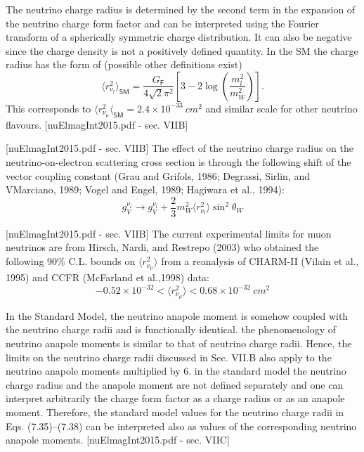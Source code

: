 The neutrino charge radius is determined by the second term in the expansion of the neutrino charge form factor and can be interpreted using the Fourier transform of a spherically symmetric charge distribution. It can also be negative since the charge density is not a positively defined quantity. In the SM the charge radius has the form of (possible other definitions exist)
\begin{equation}
\langle r_{\nu_l}^2\rangle_{\textsf{SM}}=\frac{G_{\textsf{F}}}{4\sqrt{2}\pi^2}\left[3-2\log\left(\frac{m_l^2}{m_W^2}\right)\right].
\end{equation}
This corresponds to $\langle r_{\nu_{\mu}}^2\langle_{\textsf{SM}}=2.4\times 10^{-33}\ \unit{cm^2}$ and similar scale for other neutrino flavours. [nuElmagInt2015.pdf - sec. VIIB]

[nuElmagInt2015.pdf - sec. VIIB]
The effect of the neutrino charge radius on the neutrino-on-electron scattering cross section is through the following shift of the vector coupling constant (Grau and Grifols, 1986; Degrassi, Sirlin, and VMarciano, 1989; Vogel and Engel, 1989; Hagiwara et al., 1994):
\begin{equation}
g_V^{\nu_l}\rightarrow g_V^{\nu_l}+\frac{2}{3}m_W^2\langle r_{\nu_l}^2\rangle\sin^2\theta_W
\end{equation}

[nuElmagInt2015.pdf - sec. VIIB]
The current experimental limits for muon neutrinos are from   Hirsch, Nardi, and Restrepo (2003) who obtained the
following 90\% C.L. bounds on $\langle r_{\nu_\mu}^2\rangle$ from a reanalysis of
CHARM-II (Vilain et al., 1995) and CCFR (McFarland et al.,1998) data:
\begin{equation}
-0.52\times 10^{-32}<\langle r_{\nu_\mu}^2\rangle<0.68\times 10^{-32}\ \unit{cm^2}
\end{equation}

In the Standard Model, the neutrino anapole moment is somehow coupled with the neutrino charge radii and is functionally identical. the phenomenology of neutrino anapole moments is similar to that of neutrino charge radii. Hence, the limits on the neutrino charge radii discussed in Sec. VII.B also apply to the neutrino anapole moments multiplied by 6.  in the standard model the neutrino charge radius and the anapole moment are not defined separately and one can interpret arbitrarily the charge form factor as a charge radius or as an anapole moment. Therefore, the standard model values for the neutrino charge radii in Eqs. (7.35)–(7.38) can be interpreted also as values of the corresponding neutrino anapole moments. [nuElmagInt2015.pdf - sec. VIIC]

